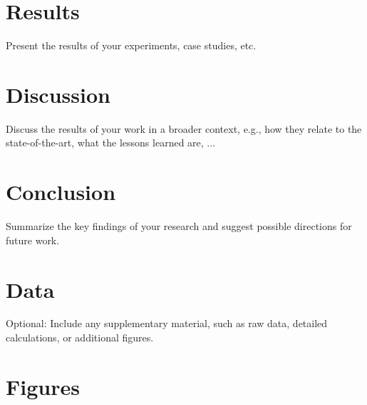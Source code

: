 \documentclass[a4paper,12pt,notitlepage,twoside,openright]{report}
\begin{document}
\chapter{Results}

Present the results of your experiments, case studies, etc. 

\chapter{Discussion}

Discuss the results of your work in a broader context, e.g., how they relate to the state-of-the-art, what the lessons learned are, ...

\chapter{Conclusion}

Summarize the key findings of your research and suggest possible directions for future work.

\cleardoublepage
{}
{}
\printglossary[type=\acronymtype, title={List of Acronyms}, toctitle={List of Acronyms}, nogroupskip]


\printbibliography

\appendix

\chapter{Data}
Optional: Include any supplementary material, such as raw data, detailed calculations, or additional figures.

\chapter{Figures}
\end{document}
